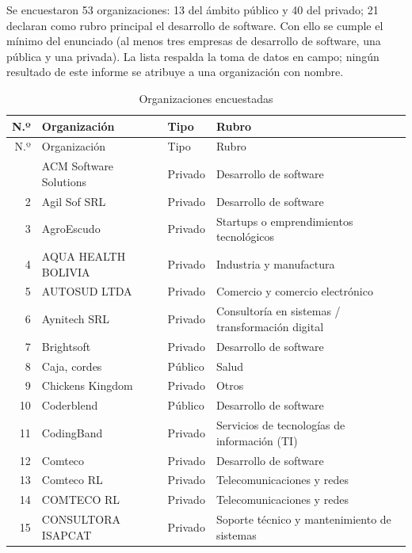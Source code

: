Se encuestaron 53 organizaciones: 13 del ámbito público y 40 del privado; 21 declaran como rubro principal el desarrollo de software. Con ello se cumple el mínimo del enunciado (al menos tres empresas de desarrollo de software, una pública y una privada). La lista respalda la toma de datos en campo; ningún resultado de este informe se atribuye a una organización con nombre.

{\small
\begin{longtable}{rL{6.2cm}lL{4.6cm}}
\caption{Organizaciones encuestadas}\\
\toprule
N.º & Organización & Tipo & Rubro \\
\midrule
\endfirsthead
\toprule
N.º & Organización & Tipo & Rubro \\
\midrule
\endhead
\bottomrule
{} & ACM Software Solutions & Privado & Desarrollo de software \\
2 & Agil Sof SRL & Privado & Desarrollo de software \\
3 & AgroEscudo & Privado & Startups o emprendimientos tecnológicos \\
4 & AQUA HEALTH BOLIVIA & Privado & Industria y manufactura \\
5 & AUTOSUD LTDA & Privado & Comercio y comercio electrónico \\
6 & Aynitech SRL & Privado & Consultoría en sistemas / transformación digital \\
7 & Brightsoft & Privado & Desarrollo de software \\
8 & Caja, cordes & Público & Salud \\
9 & Chickens Kingdom & Privado & Otros \\
10 & Coderblend & Público & Desarrollo de software \\
11 & CodingBand & Privado & Servicios de tecnologías de información (TI) \\
12 & Comteco & Privado & Desarrollo de software \\
13 & Comteco RL & Privado & Telecomunicaciones y redes \\
14 & COMTECO RL & Privado & Telecomunicaciones y redes \\
15 & CONSULTORA ISAPCAT & Privado & Soporte técnico y mantenimiento de sistemas \\

\end{longtable}}
